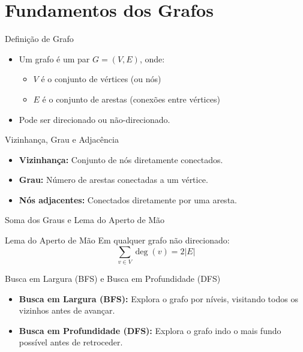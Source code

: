 \section{Fundamentos dos Grafos}

\begin{frame}[plain]
  \centering
  \Huge \insertsection
\end{frame}

\begin{frame}{Definição de Grafo}
  \begin{itemize}
    \item Um grafo é um par \( G = (V, E) \), onde:
    \begin{itemize}
        \item \( V \) é o conjunto de vértices (ou nós)
        \item \( E \) é o conjunto de arestas (conexões entre vértices)
    \end{itemize}
    \item Pode ser direcionado ou não-direcionado.
  \end{itemize}
\end{frame}

\begin{frame}{Vizinhança, Grau e Adjacência}
  \begin{itemize}
    \item \textbf{Vizinhança:} Conjunto de nós diretamente conectados.
    \item \textbf{Grau:} Número de arestas conectadas a um vértice.
    \item \textbf{Nós adjacentes:} Conectados diretamente por uma aresta.
  \end{itemize}
\end{frame}

\begin{frame}{Soma dos Graus e Lema do Aperto de Mão}
  \begin{block}{Lema do Aperto de Mão}
    Em qualquer grafo não direcionado:
    \[
    \sum_{v \in V} \deg(v) = 2|E|
    \]
  \end{block}
\end{frame}

\begin{frame}{Busca em Largura (BFS) e Busca em Profundidade (DFS)}
  \begin{itemize}
    \item \textbf{Busca em Largura (BFS):} Explora o grafo por níveis, visitando todos os vizinhos antes de avançar.
    \item \textbf{Busca em Profundidade (DFS):} Explora o grafo indo o mais fundo possível antes de retroceder.
  \end{itemize}
\end{frame}

